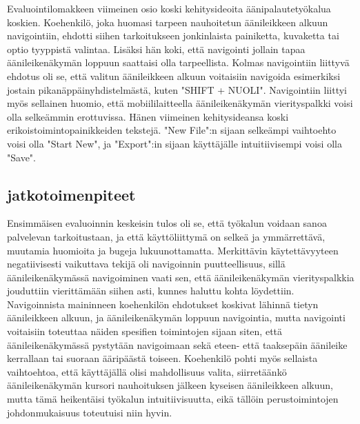\documentclass[utf8]{gradu3}
\begin{document}
Evaluointilomakkeen viimeinen osio koski kehitysideoita äänipalautetyökalua koskien. Koehenkilö, joka huomasi tarpeen nauhoitetun äänileikkeen alkuun navigointiin, ehdotti siihen tarkoitukseen jonkinlaista painiketta, kuvaketta tai optio tyyppistä valintaa. Lisäksi hän koki, että navigointi jollain tapaa äänileikenäkymän loppuun saattaisi olla tarpeellista. Kolmas navigointiin liittyvä ehdotus oli se, että valitun äänileikkeen alkuun voitaisiin navigoida esimerkiksi jostain pikanäppäinyhdistelmästä, kuten "SHIFT + NUOLI". Navigointiin liittyi myös sellainen huomio, että mobiililaitteella äänileikenäkymän vierityspalkki voisi olla selkeämmin erottuvissa. Hänen viimeinen kehitysideansa koski erikoistoimintopainikkeiden tekstejä. "New File":n sijaan selkeämpi vaihtoehto voisi olla "Start New", ja "Export":in sijaan käyttäjälle intuitiivisempi voisi olla "Save".

\subsection{jatkotoimenpiteet}

Ensimmäisen evaluoinnin keskeisin tulos oli se, että työkalun voidaan sanoa palvelevan tarkoitustaan, ja että käyttöliittymä on selkeä ja ymmärrettävä, muutamia huomioita ja bugeja lukuunottamatta. Merkittävin käytettävyyteen negatiivisesti vaikuttava tekijä oli navigoinnin puutteellisuus, sillä äänileikenäkymässä navigoiminen vaati sen, että äänileikenäkymän vierityspalkkia jouduttiin vierittämään siihen asti, kunnes haluttu kohta löydettiin. Navigoinnista maininneen koehenkilön ehdotukset koskivat lähinnä tietyn äänileikkeen alkuun, ja äänileikenäkymän loppuun navigointia, mutta navigointi voitaisiin toteuttaa näiden spesifien toimintojen sijaan siten, että äänileikenäkymässä pystytään navigoimaan sekä eteen- että taaksepäin äänileike kerrallaan tai suoraan ääripäästä toiseen. Koehenkilö pohti myös sellaista vaihtoehtoa, että käyttäjällä olisi mahdollisuus valita, siirretäänkö äänileikenäkymän kursori nauhoituksen jälkeen kyseisen äänileikkeen alkuun, mutta tämä heikentäisi työkalun intuitiivisuutta, eikä tällöin perustoimintojen johdonmukaisuus toteutuisi niin hyvin.
\end{document}
